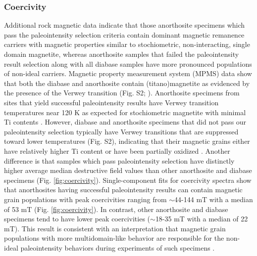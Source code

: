 \documentclass[9pt,twocolumn,twoside,lineno]{pnas-new}
\begin{document}
\subsubsection*{Coercivity}
Additional rock magnetic data indicate that those anorthosite specimens which pass the paleointensity selection criteria contain dominant magnetic remanence carriers with magnetic properties similar to stochiometric, non-interacting, single domain magnetite, whereas anorthosite samples that failed the paleointensity result selection along with all diabase samples have more pronounced populations of non-ideal carriers. Magnetic property measurement system (MPMS) data show that both the diabase and anorthosite contain (titano)magnetite as evidenced by the presence of the Verwey transition (Fig. S2;  \citealp{Verwey1939a, Feinberg2015a}). Anorthosite specimens from sites that yield successful paleointensity results have Verwey transition temperatures near 120 K as expected for stochiometric magnetite with minimal Ti contents \cite{Ozdemir1993a}. However, diabase and anorthosite specimens that did not pass our paleointensity selection typically have Verwey transitions that are suppressed toward lower temperatures (Fig. S2), indicating that their magnetic grains either have relatively higher Ti content or have been partially oxidized \cite{Ozdemir1993a}. Another difference is that samples which pass paleointensity selection have distinctly higher average median destructive field values than other anorthosite and diabase specimens (Fig. \ref{fig:coercivity}). Single-component fits for coercivity spectra \cite{Maxbauer2016a} show that anorthosites having successful paleointensity results can contain magnetic grain populations with peak coercivities ranging from $\sim$44-144 mT with a median of 53 mT (Fig. \ref{fig:coercivity}). In contrast, other anorthosite and diabase specimens tend to have lower peak coercivities ($\sim$18-35 mT with a median of 22 mT). This result is consistent with an interpretation that magnetic grain populations with more multidomain-like behavior are responsible for the non-ideal paleointensity behaviors during experiments of such specimens \cite{Xu2004a}.
\end{document}
